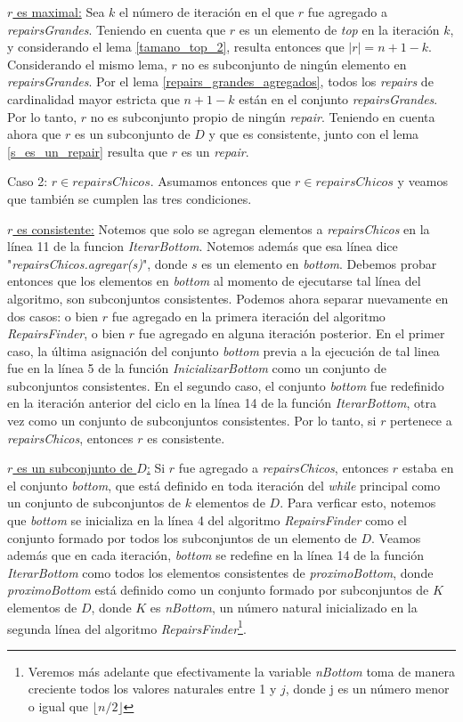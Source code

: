 \documentclass[11pt,a4paper,twoside]{tesis}
\begin{document}
\underline{$r$ es maximal:}  Sea $k$ el número de iteración en el que $r$ fue agregado a \textit{repairsGrandes}. Teniendo en cuenta que $r$ es un elemento de \textit{top} en la iteración $k$, y considerando el lema \ref{tamano_top_2}, resulta entonces que $|r| = n + 1 - k$. Considerando el mismo lema, $r$ no es subconjunto de ningún elemento en \textit{repairsGrandes}.
Por el lema \ref{repairs_grandes_agregados}, todos los \textit{repairs} de cardinalidad mayor estricta que $n + 1 - k$ están en el conjunto \textit{repairsGrandes}. Por lo tanto, $r$ no es subconjunto propio de ningún \textit{repair}. Teniendo en cuenta ahora que $r$ es un subconjunto de $D$ y que es consistente, junto con el lema \ref{s_es_un_repair} resulta que $r$ es un \textit{repair}.

Caso 2: $r \in repairsChicos$. Asumamos entonces que $r \in repairsChicos$ y veamos que también se cumplen las tres condiciones.

\underline{$r$ es consistente:} Notemos que solo se agregan elementos a \textit{repairsChicos} en la línea 11 de la funcion \textit{IterarBottom}. Notemos además que esa línea dice "\textit{repairsChicos.agregar(s)}", donde $s$ es un elemento en \textit{bottom}. Debemos probar entonces que los elementos en \textit{bottom} al momento de ejecutarse tal línea del algoritmo, son subconjuntos consistentes. Podemos ahora separar nuevamente en dos casos: o bien $r$ fue agregado en la primera iteración del algoritmo \textit{RepairsFinder}, o bien $r$ fue agregado en alguna iteración posterior. En el primer caso, la última asignación del conjunto \textit{bottom} previa a la ejecución de tal linea fue en la línea 5 de la función \textit{InicializarBottom} como un conjunto de subconjuntos consistentes. En el segundo caso, el conjunto \textit{bottom} fue redefinido en la iteración anterior del ciclo en la línea 14 de la función \textit{IterarBottom}, otra vez como un conjunto de subconjuntos consistentes. Por lo tanto, si $r$ pertenece a \textit{repairsChicos}, entonces $r$ es consistente.

\underline{$r$ es un subconjunto de $D$:} Si $r$ fue agregado a \textit{repairsChicos}, entonces $r$ estaba en el conjunto \textit{bottom}, que está definido en toda iteración del \textit{while} principal como un conjunto de subconjuntos de $k$ elementos de $D$. Para verficar esto, notemos que \textit{bottom} se inicializa en la línea 4 del algoritmo \textit{RepairsFinder} como el conjunto formado por todos los subconjuntos de un elemento de $D$. Veamos además que en cada iteración, \textit{bottom} se redefine en la línea 14 de la función \textit{IterarBottom} como todos los elementos consistentes de \textit{proximoBottom}, donde \textit{proximoBottom} está definido como un conjunto formado por subconjuntos de $K$ elementos de $D$, donde $K$ es \textit{nBottom}, un número natural inicializado en la segunda línea del algoritmo \textit{RepairsFinder}\footnote{Veremos más adelante que efectivamente la variable \textit{nBottom} toma de manera creciente todos los valores naturales entre 1 y $j$, donde j es un número menor o igual que $\lfloor n/2 \rfloor$}.
\end{document}
